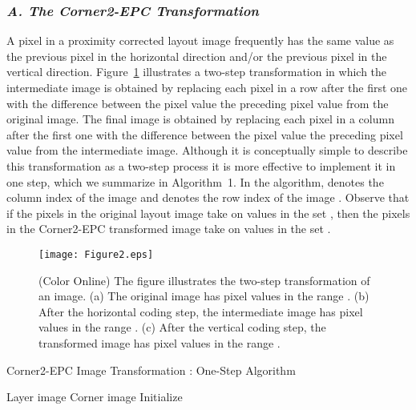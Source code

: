 \documentclass{article}
\begin{document}
\subsubsection*{{\em A. The Corner2-EPC Transformation}}
A pixel in a proximity corrected layout image frequently has the same value
as the previous pixel in the horizontal direction and/or the previous
pixel in the vertical direction.  Figure~\ref{fig:trans} illustrates a 
two-step 
transformation in which the intermediate image is obtained by replacing
each pixel in a row after the first one with the difference between the
pixel value the preceding pixel value from the original image.
The final image is obtained by replacing each pixel in a column after the 
first one with the difference between the pixel value the preceding pixel 
value from the intermediate image.
Although it is conceptually simple to describe this transformation as a
two-step process it is more effective to implement it in one step, which
we summarize in Algorithm~1.  In the algorithm,  denotes the column index 
 of the image and  denotes the row index 
of the image .  Observe that if the pixels in the original
layout image take on values in the set , then
the pixels in the Corner2-EPC transformed image take on values in the set 
.  

\begin{figure}
\centering
\texttt{[image: Figure2.eps]}
\caption{(Color Online) The figure illustrates the two-step transformation 
of an image. (a) The original image has pixel values in 
the range . (b) After the horizontal coding step, the 
intermediate image has pixel values in the range . 
(c) After the vertical coding step, the transformed image has pixel values 
in the range .}
\label{fig:trans}
\end{figure}

\begin{algorithm}[!htb]
\caption{Corner2-EPC Image Transformation : One-Step Algorithm}
\label{alg:transform1}
\begin{algorithmic}[1]
\renewcommand{\algorithmicrequire} {\textbf{Input:}}
\REQUIRE Layer image 
\renewcommand{\algorithmicrequire} {\textbf{Output:}}
\REQUIRE Corner image 
\STATE Initialize 
\FOR { \TO } 
        \STATE 
\ENDFOR
\FOR { \TO }
        \STATE 
        \FOR { \TO }
        \STATE 
        \ENDFOR
\ENDFOR
\end{algorithmic}
\end{algorithm}
\end{document}
